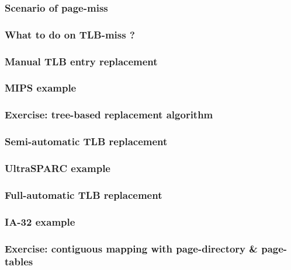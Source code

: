 
\begin{frame}
  \frametitle{Scenario of page-miss}

\end{frame}


\begin{frame}
  \frametitle{What to do on TLB-miss ?}

\end{frame}


\begin{frame}
  \frametitle{Manual TLB entry replacement}

\end{frame}


\begin{frame}
  \frametitle{MIPS example}

\end{frame}


\begin{frame}
  \frametitle{Exercise: tree-based replacement algorithm}

\end{frame}


\begin{frame}
  \frametitle{Semi-automatic TLB replacement}

\end{frame}


\begin{frame}
  \frametitle{UltraSPARC example}

\end{frame}


\begin{frame}
  \frametitle{Full-automatic TLB replacement}

\end{frame}


\begin{frame}
  \frametitle{IA-32 example}

\end{frame}


\begin{frame}
  \frametitle{Exercise: contiguous mapping with page-directory \&
  page-tables}

\end{frame}

